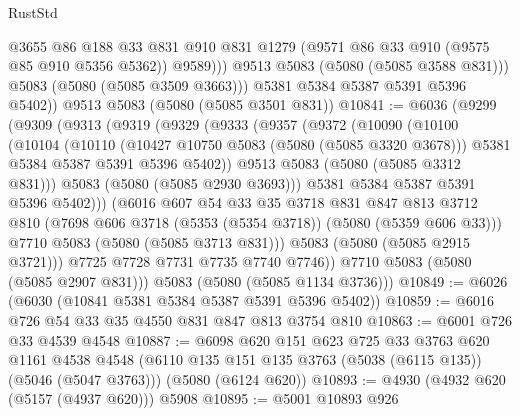\begin{lexlean}{RustStd}
\begin{coremodule}
                  @3655
                  @86
                  @188
                  @33
                  @831
                  @910
                  @831
                  @1279
                  (@9571 @86 @33 @910 (@9575 @85 @910 @5356 @5362))
                  @9589)))
            @9513
            @5083
            (@5080 (@5085 @3588 @831)))
          @5083
          (@5080 (@5085 @3509 @3663)))
        @5381
        @5384
        @5387
        @5391
        @5396
        @5402))
    @9513
    @5083
    (@5080 (@5085 @3501 @831))
@10841 := @6036
    (@9299
      (@9309
        (@9313
          (@9319
            (@9329
              (@9333
                (@9357
                  (@9372
                    (@10090
                      (@10100
                        (@10104
                          (@10110
                            (@10427 @10750 @5083 (@5080 (@5085 @3320 @3678)))
                            @5381
                            @5384
                            @5387
                            @5391
                            @5396
                            @5402))
                        @9513
                        @5083
                        (@5080 (@5085 @3312 @831)))
                      @5083
                      (@5080 (@5085 @2930 @3693)))
                    @5381
                    @5384
                    @5387
                    @5391
                    @5396
                    @5402)))
              (@6016
                @607
                @54
                @33
                @35
                @3718
                @831
                @847
                @813
                @3712
                @810
                (@7698 @606 @3718 (@5353 (@5354 @3718)) (@5080 (@5359 @606 @33)))
                @7710
                @5083
                (@5080 (@5085 @3713 @831)))
              @5083
              (@5080 (@5085 @2915 @3721)))
            @7725
            @7728
            @7731
            @7735
            @7740
            @7746))
        @7710
        @5083
        (@5080 (@5085 @2907 @831)))
      @5083
      (@5080 (@5085 @1134 @3736)))
@10849 := @6026 (@6030 (@10841 @5381 @5384 @5387 @5391 @5396 @5402))
@10859 := @6016 @726 @54 @33 @35 @4550 @831 @847 @813 @3754 @810
@10863 := @6001 @726 @33 @4539 @4548
@10887 := @6098
    @620
    @151
    @623
    @725
    @33
    @3763
    @620
    @1161
    @4538
    @4548
    (@6110 @135 @151 @135 @3763 (@5038 (@6115 @135)) (@5046 (@5047 @3763)))
    (@5080 (@6124 @620))
@10893 := @4930 (@4932 @620 (@5157 (@4937 @620))) @5908
@10895 := @5001 @10893 @926

\end{coremodule}
\end{lexlean}
